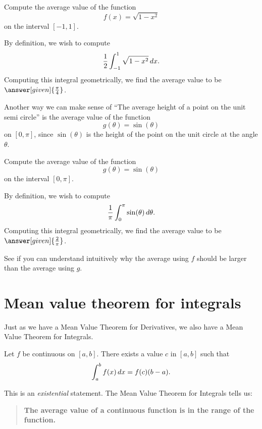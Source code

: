 \documentclass{ximera}
\begin{document}
\begin{example}
  Compute the average value of the function
  \[
  f(x) =\sqrt{1-x^2}
  \]
  on the interval $[-1,1]$.
  \begin{explanation}
    By definition, we wish to compute
    \[
    \frac{1}{2}\int_{-1}^1 \sqrt{1-x^2} \mathop{}\!d x.
    \]
    Computing this integral geometrically, we find the average value
    to be $\answer[given]{\frac{\pi}{4}}$.
  \end{explanation}
\end{example}
Another way we can make sense of ``The average height of a point on the
unit semi circle'' is the average value of the function
\[
g(\theta) =\sin(\theta)
\]
on $[0,\pi]$, since $\sin(\theta)$ is the height of the point on the
unit circle at the angle $\theta$.
\begin{example}
  Compute the average value of the function
  \[
  g(\theta) =\sin(\theta)
  \]
  on the interval $[0,\pi]$.
  \begin{explanation}
    By definition, we wish to compute
    \[
    \frac{1}{\pi} \int_0^\pi\sin(\theta) \mathop{}\!d \theta.
    \]
    Computing this integral geometrically, we find the average value
    to be $\answer[given]{\frac{2}{\pi}}$.
  \end{explanation}
\end{example}

See if you can understand intuitively why the average using $f$ should
be larger than the average using $g$.  %



\section{Mean value theorem for integrals}

Just as we have a Mean Value Theorem for Derivatives, we also have a
Mean Value Theorem for Integrals.


\begin{theorem}
Let $f$ be continuous on $[a,b]$. There exists a value $c$ in $[a,b]$
such that
\[
\int_a^bf(x)\mathop{}\!d x = f(c)(b-a).
\]
\end{theorem}

This is an \emph{existential} statement. The Mean Value Theorem for
Integrals tells us:
\begin{quote}
\textbf{The average value of a continuous function is in the range of
  the function.}
\end{quote}
\end{document}
